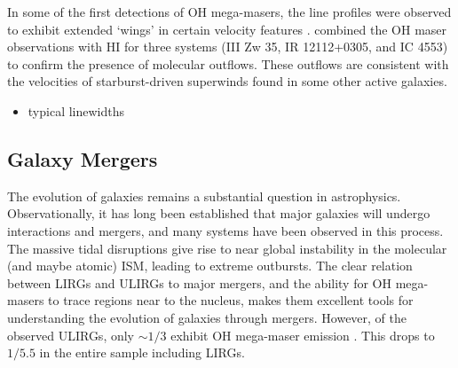In some of the first detections of OH mega-masers, the line profiles were observed to exhibit extended `wings' in certain velocity features \citep{Baan_1987,Baan_1989}. \citet{Baan_1989} combined the OH maser observations with HI for three systems (III Zw 35, IR 12112+0305, and IC 4553) to confirm the presence of molecular outflows. These outflows are consistent with the velocities of starburst-driven superwinds found in some other active galaxies. 

\begin{itemize}
\item typical linewidths 
\end{itemize}




\subsection{Galaxy Mergers}
\label{sub:oh_mergers}

The evolution of galaxies remains a substantial question in astrophysics. Observationally, it has long been established that major galaxies will undergo interactions and mergers, and many systems have been observed in this process. The massive tidal disruptions give rise to near global instability in the molecular (and maybe atomic) ISM, leading to extreme outbursts. The clear relation between LIRGs and ULIRGs to major mergers, and the ability for OH mega-masers to trace regions near to the nucleus, makes them excellent tools for understanding the evolution of galaxies through mergers. However, of the observed ULIRGs, only $\sim 1/3$ exhibit OH mega-maser emission \citep{darling2002_paperIII}. This drops to $1/5.5$ in the entire sample including LIRGs.

